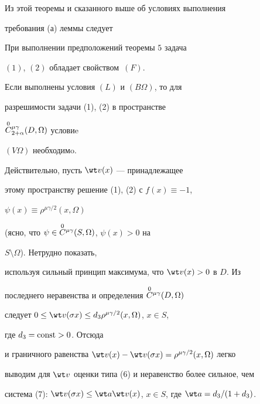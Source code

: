 


Из этой теоремы и сказанного выше об условиях выполнения 


требования (а) леммы следует 


 


\begin{thm} 


При выполнении предположений теоремы $5$ задача 


$(1)$, $(2)$ обладает свойст\-вом~$(F)$. 


\end{thm} 


 


\begin{note} 


Если выполнены условия $(L)$ и $(B\Omega)$, то для 


разрешимости задачи (1), (2) в пространстве 


$\overset{0}{C}{}^{\mu\gamma}_{2+\alpha}(D,\Omega)$ условиe 


$(V\Omega)$ необходимo.





Действительно, пусть $\wt v(x)$ --- принадлежащее 


этому пространству решение (1), (2) с $f(x)\equiv-1$, 


$\psi(x)\equiv\rho^{\mu\gamma/2}(x,\Omega)$ 


(ясно, что $\psi\in\overset{0}{C}{}^{\mu\gamma}(S,\Omega)$, $\psi(x)>0$ на 


$S\setminus\Omega$). Нетрудно показать, 


используя сильный принцип максимума, что $\wt v(x)>0$ в $D$. Из 


последнего неравенства и определения $\overset{0}{C}{}^{\mu\gamma}(D,\Omega)$ 


следует $0\le\wt v(\sigma x)\le d_3\rho^{\mu\gamma/2}(x,\Omega)$, $x\in S$,


где $d_3=\operatorname{const}>0$. Отсюда 


и граничного равенства $\wt v(x)-\wt v(\sigma 


x)=\rho^{\mu\gamma/2}(x,\Omega)$ легко 


выводим для $\wt v$ оценки типа (6) и неравенство более сильное, чем 


система (7): $\wt v(\sigma x)\le \wt a\wt v(x)$, $x\in S$, где $\wt 


a=d_3/(1+d_3)$. 


\end{note} 


